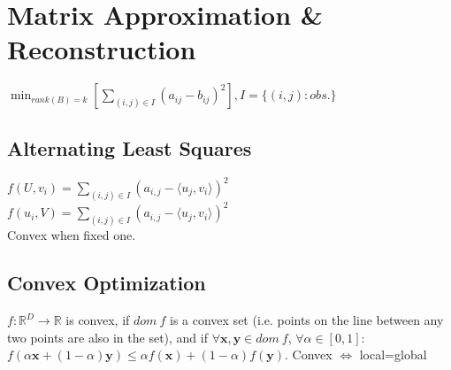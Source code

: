 \section{Matrix Approximation \& Reconstruction}

$\min_{rank(B)=k}[\sum_{(i,j)\in I}{(a_{ij}-b_{ij})^2}], I=\{(i,j): \mathit{obs.}\}$
\subsection*{Alternating Least Squares}
$f(U,v_i) = \sum_{(i,j)\in I} (a_{i,j} - \langle u_j, v_i \rangle)^2$\\
$f(u_i,V) = \sum_{(i,j)\in I} (a_{i,j} - \langle u_j, v_i \rangle)^2$\\
Convex when fixed one.




\subsection*{Convex Optimization}
$f : \mathbb{R}^D \rightarrow \mathbb{R}$ is convex, if $dom\ f$ is a convex set (i.e. points on the line between any two points are also in the set), and if $\forall \mathbf{x}, \mathbf{y} \in dom\ f$, $\forall \alpha\in[0,1]$: $f(\alpha \mathbf{x} + (1 - \alpha)\mathbf{y}) \leq \alpha f(\mathbf{x}) + (1-\alpha)f(\mathbf{y})$. 
Convex $\iff$ local=global

